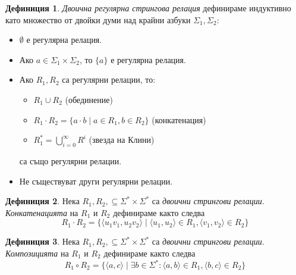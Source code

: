 \documentclass[12pt, oneside]{article}
\theoremstyle{definition}
\newtheorem{definition}{Дефиниция}[section]
\begin{document}
\begin{definition} 
	\emph{Двоична регулярна стрингова релация} дефинираме индуктивно като множество от двойки думи над крайни азбуки \( \Sigma_1, \Sigma_2 \):
	\begin{itemize}
		\item \( \emptyset \) е регулярна релация.
		\item Ако \( a \in \Sigma_1 \times \Sigma_2 \), то \( \{ a \} \) е регулярна релация.
		\item Ако \( R_1, R_2 \) са регулярни релации, то:
		\begin{itemize}
			\item \( R_1 \cup R_2 \) (обединение)
			\item \( R_1 \cdot R_2 = \{ a \cdot b \mid a \in R_1, b \in R_2 \} \) (конкатенация)
			\item \( R_1^* = \bigcup_{i=0}^{\infty}R^i \) (звезда на Клини)
		\end{itemize}
		са също регулярни релации.
		\item Не съществуват други регулярни релации.
	\end{itemize}
\end{definition}

\begin{definition}
	Нека \( R_1, R_2, \subseteq \Sigma^* \times \Sigma^* \) са \emph{двоични стрингови релации}. \emph{Конкатенацията} на \( R_1 \) и \( R_2 \) дефинираме както следва
	\[ R_1 \cdot R_2 = \{ \langle u_1 v_1, u_2 v_2 \rangle \mid \langle u_1, u_2 \rangle \in R_1, \langle v_1, v_2 \rangle \in R_2 \} \]
\end{definition}

\begin{definition}
	Нека \( R_1, R_2, \subseteq \Sigma^* \times \Sigma^* \) са \emph{двоични стрингови релации}. \emph{Композицията} на \( R_1 \) и \( R_2 \) дефинираме както следва
	\[ R_1 \circ R_2 = \{ \langle a, c \rangle \mid \exists b \in \Sigma^* : \langle a, b \rangle \in R_1, \langle b, c \rangle \in R_2 \} \]
\end{definition}
\end{document}
